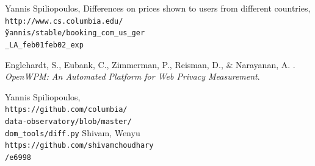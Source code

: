 \documentclass[fleqn,12pt]{SelfArx} %
\begin{document}
\begin{thebibliography}{9}
Yannis Spiliopoulos, Differences on prices shown to users from different countries,
\\\texttt{http://www.cs.columbia.edu/\\\~yannis/stable/booking\_com\_us\_ger\\\_LA\_feb01\-feb02\_exp}
 
Englehardt, S., Eubank, C., Zimmerman, P., Reisman, D., \& Narayanan, A. . 
\textit{OpenWPM: An Automated Platform for Web Privacy Measurement}.
 
Yannis Spiliopoulos,
\\\texttt{https://github.com/columbia/\\data-observatory/blob/master/\\dom\_tools/diff.py}
Shivam, Wenyu
\\\texttt{https://github.com/shivamchoudhary\\/e6998}
\end{thebibliography}
\end{document}
